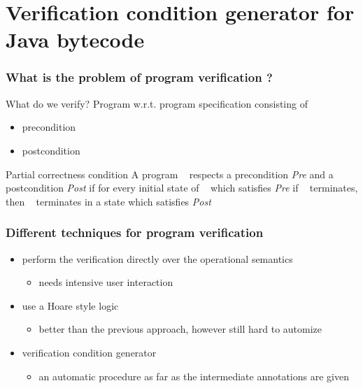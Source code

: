 \documentclass{beamer}
\begin{document}
\section{Verification condition generator for Java bytecode}
\begin{frame}[shrink]
\frametitle{What is the problem of program verification ?}
\begin{block}{What do we verify?} 
 Program w.r.t.   program specification consisting of 
   \begin{itemize} 
       \item precondition %
       \item postcondition %
    \end{itemize}
\end{block}
\pause
\begin{block}{Partial correctness condition}
  A program \program~ respects a precondition \textit{Pre} and a 
 postcondition \textit{Post}  if for every initial state of  \program~ which satisfies \textit{Pre}
 if \program~ terminates, then \program~ terminates  in a state which  satisfies \textit{Post}
\end{block}
\end{frame}


\begin{frame}\frametitle{Different techniques for program verification}
 \begin{itemize}
       \item perform the verification directly over the operational semantics
               \pause  \begin{itemize} 
                             \item  needs intensive user interaction
			\end{itemize}
                       \pause	
       \item use a Hoare style logic \pause 
                \begin{itemize} 
                        \item better than the previous approach, however still hard to automize 	
                \end{itemize}      
			  \pause	
       \item verification condition generator
                 \pause 
                \begin{itemize} 
                        \item an automatic procedure as far as the intermediate annotations are given  	     
               \end{itemize}
     \end{itemize}
\end{frame}
 
\end{document}
